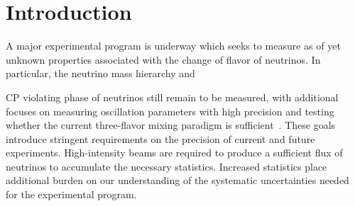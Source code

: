 \documentclass{ar-1col}
\begin{document}
\maketitle

\tableofcontents


\section{Introduction\label{sec:intro}}

A major experimental program is underway which seeks to measure
as of yet unknown properties associated with the change of flavor of neutrinos.
In particular, the neutrino mass hierarchy and%
\begin{marginnote}
\end{marginnote}%
CP violating phase
of neutrinos still remain to be measured, with additional focuses on measuring
oscillation parameters with high precision and testing whether the current
three-flavor mixing paradigm is sufficient~\cite{Esteban:2020cvm, ParticleDataGroup:2020ssz}.
These goals introduce stringent requirements on the precision of current and future experiments.
High-intensity beams are required to produce a sufficient flux of neutrinos to accumulate the necessary statistics.
Increased statistics place additional burden on our understanding of the systematic uncertainties needed for the experimental program.
\end{document}
